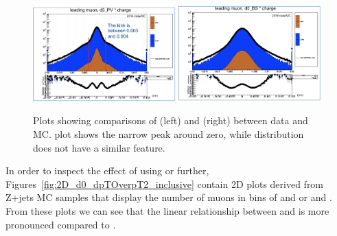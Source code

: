\begin{figure}[h!]
    \centering
    \includegraphics[width=0.49\textwidth]{images_geofit/d0_PV_data_MC_comp.png}
    \includegraphics[width=0.49\textwidth]{images_geofit/d0_BS_data_MC_comp.png}
    \caption{Plots showing comparisons of \dzeroPV (left) and \dzeroBS (right) between data and MC. \dzeroPV plot shows the narrow peak around zero, while \dzeroBS distribution does not have a similar feature.}
    \label{fig:d0_data_MC_comparisons}
\end{figure}

In order to inspect the effect of using \dzeroPV or \dzeroBS further, Figures~\ref{fig:2D_d0_dpTOverpT2_inclusive} contain 2D plots derived from Z+jets MC samples that display the number of muons in bins of \dptoverptsquare and \dzeroPV or \dptoverptsquare and \dzeroBS. From these plots we can see that the linear relationship between \dptoverptsquare and \dzeroBS is more pronounced compared to \dzeroPV. 

